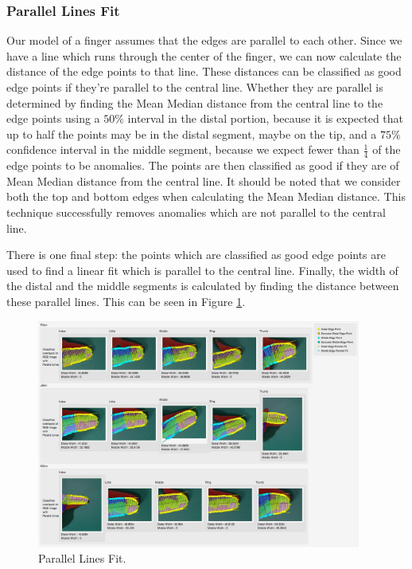 \subsubsection{Parallel Lines Fit}\label{sec:ParallelLinesFit}
Our model of a finger assumes that the edges are parallel to each other. Since we have a line which runs through the center of the finger, we can now calculate the distance of the edge points to that line. These distances can be classified as good edge points if they're parallel to the central line. Whether they are parallel is determined by finding the Mean Median distance from the central line to the edge points using a $50\%$ interval in the distal portion, because it is expected that up to half the points may be in the distal segment, maybe on the tip, and a $75\%$ confidence interval in the middle segment, because we expect fewer than $\frac{1}{4}$ of the edge points to be anomalies. The points are then classified as good if they are of Mean Median distance from the central line. It should be noted that we consider both the top and bottom edges when calculating the Mean Median distance. This technique successfully removes anomalies which are not parallel to the central line.

There is one final step: the points which are classified as good edge points are used to find a linear fit which is parallel to the central line. Finally, the width of the distal and the middle segments is calculated by finding the distance between these parallel lines. This can be seen in Figure \ref{fig:ParallelFit}.

\begin{figure}[h!]
  \centering
    \includegraphics[width=0.95\textwidth]{Chapter4/Figs/ParallelFit.jpg}
    \caption{Parallel Lines Fit.}\label{fig:ParallelFit}
\end{figure}

